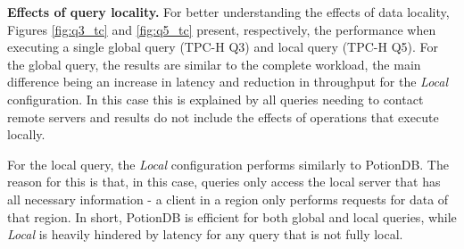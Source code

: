 \documentclass[sigplan,twocolumn,review,anonymous]{acmart}
\begin{document}
\noindent
\textbf{Effects of query locality.}
For better understanding the effects of data locality,  Figures \ref{fig:q3_tc} and \ref{fig:q5_tc} present, respectively, the performance when
executing a single global query (TPC-H Q3) and local query (TPC-H Q5). 
For the global query, the results are similar to the complete workload, the main difference being an increase in latency and reduction in  throughput for the \textit{Local} configuration. In this case this is explained by all queries needing to contact remote servers and results do not include the effects of operations that execute locally.

For the local query, the \textit{Local} configuration performs similarly to PotionDB. The reason for this is that, in this case, queries only access the local server that has all necessary information - a client in a region only performs requests for data of that region.
In short, PotionDB is efficient for both global and local queries, while \textit{Local} is heavily hindered by latency for any query that is not fully local.

%
%
%
\end{document}
